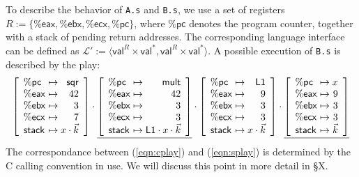 \documentclass[acmsmall,authordraft]{acmart}
\newcommand{\kw}[1]{\ensuremath{ \mathsf{#1} }}
\begin{document}
\begin{example}
To describe the behavior of \texttt{A.s} and \texttt{B.s},
we use a set of registers
$R := \{ \kw{\%eax}, \kw{\%ebx}, \kw{\%ecx},
         \kw{\%pc} \}$,
where $\kw{\%pc}$ denotes the program counter,
together with a stack of pending return addresses.
The corresponding language interface can be defined as
$\mathcal{L}' :=
 \langle \kw{val}^R \times \kw{val}^*,
         \kw{val}^R \times \kw{val}^* \rangle$.
A possible execution of \texttt{B.s}
is described by the play:
\begin{equation} \label{eqn:splay}
  \left[
    \begin{array}{l@{{} \mapsto {}}r}
      \kw{\%pc}  & \kw{sqr} \\
      \kw{\%eax} & 42 \\
      \kw{\%ebx} & 3 \\
      \kw{\%ecx} & 7 \\
      \kw{stack} & x \cdot \vec{k}
    \end{array}
  \right] \cdot
  \underline{
    \left[
      \begin{array}{l@{{} \mapsto {}}r}
        \kw{\%pc}  & \kw{mult} \\
        \kw{\%eax} & 42 \\
        \kw{\%ebx} & 3 \\
        \kw{\%ecx} & 3 \\
        \kw{stack} & \kw{L1} \cdot x \cdot \vec{k}
      \end{array}
    \right]} \cdot
  \left[
    \begin{array}{l@{{} \mapsto {}}r}
      \kw{\%pc}  & \kw{L1} \\
      \kw{\%eax} & 9 \\
      \kw{\%ebx} & 3 \\
      \kw{\%ecx} & 3 \\
      \kw{stack} & x \cdot \vec{k}
    \end{array}
  \right] \cdot
  \underline{
    \left[
      \begin{array}{l@{{} \mapsto {}}r}
        \kw{\%pc}  & x \\
        \kw{\%eax} & 9 \\
        \kw{\%ebx} & 3 \\
        \kw{\%ecx} & 3 \\
        \kw{stack} & \vec{k}
      \end{array}
    \right]}
\end{equation}
The correspondance between (\ref{eqn:cplay}) and (\ref{eqn:splay})
is determined by the C calling convention in use.
We will discuss this point in more detail in \S X.
\end{example}
\end{document}
